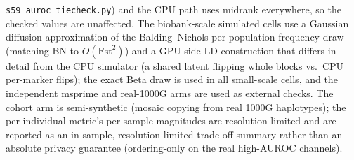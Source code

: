 \documentclass[11pt]{article}
\begin{document}
\texttt{s59\_auroc\_tiecheck.py}) and the CPU path uses midrank everywhere, so
the checked values are unaffected. The
biobank-scale simulated cells use a Gaussian diffusion
approximation of the Balding--Nichols per-population frequency draw (matching BN
to $O(\text{Fst}^2)$) and a GPU-side LD construction that differs in detail from
the CPU simulator (a shared latent flipping whole blocks vs.\ CPU per-marker
flips); the exact Beta draw is used in all small-scale cells, and
the independent msprime and real-1000G arms are used as external checks. The
cohort arm is semi-synthetic (mosaic copying from real 1000G haplotypes); the
per-individual metric's per-sample magnitudes are resolution-limited and are
reported as an in-sample, resolution-limited trade-off summary rather than an
absolute privacy guarantee (ordering-only on the real high-AUROC channels).
\end{document}
